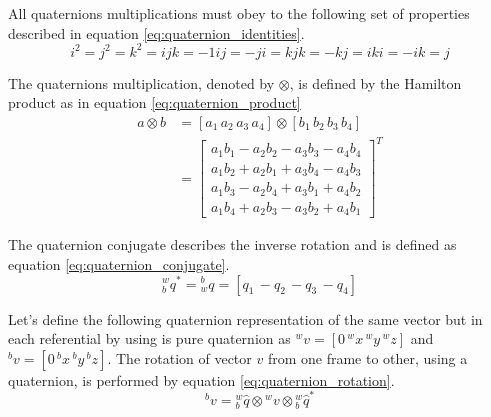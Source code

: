 \begin{description}[]
	\label{list:quaternion_operations}
	\item [Identities] All quaternions multiplications must obey to the following set of properties described in equation \ref{eq:quaternion_identities}.
	\begin{subequations}
		\label{eq:quaternion_identities}
		\begin{equation}
		i^2=j^2 = k^2 = ijk = -1
		\end{equation}
		\begin{equation}
		ij =-ji=k
		\end{equation}
		\begin{equation}
		jk =-kj=i
		\end{equation}
		\begin{equation}
		ki =-ik= j
		\end{equation}
	\end{subequations}
	\item [Quaternion multiplication] The quaternions multiplication, denoted by $\otimes$, is defined by the Hamilton product as in equation \ref{eq:quaternion_product}
	\begin{equation}
	\begin{aligned}
	a \otimes b &= [a_1\, a_2\, a_3\, a_4] \otimes [b_1\, b_2\, b_3\, b_4]\\
	&= \begin{bmatrix}
	a_1b_1 -a_2b_2 -a_3b_3 -a_4b_4\\
	a_1b_2 +a_2b_1 +a_3b_4 -a_4b_3\\
	a_1b_3 -a_2b_4 +a_3b_1 +a_4b_2\\
	a_1b_4 +a_2b_3 -a_3b_2 +a_4b_1
	
	\end{bmatrix}^T
	\end{aligned}
	\label{eq:quaternion_product} 
	\end{equation}
	\item [Quaternion conjugate] The quaternion conjugate describes the inverse rotation and is defined as equation \ref{eq:quaternion_conjugate}.
	\begin{equation}
	{}^w_bq^* = {}^b_wq = [q_1\, -q_2\, -q_3\, -q_4]
	\label{eq:quaternion_conjugate} 
	\end{equation}
	\item [Vector rotation] Let's define the following quaternion representation of the same vector but in each referential by using is \gls{pure quaternion} as ${}^wv = [0\,{}^wx\,{}^wy\,{}^wz]$ and ${}^bv = [0\,{}^bx\,{}^by\,{}^bz]$. The rotation of vector $v$ from one frame to other, using a quaternion, is performed by equation \ref{eq:quaternion_rotation}.
	\begin{equation}
	{}^bv = {}^w_b\hat{q} \otimes {}^wv \otimes {}^w_b\hat{q}^*
	\label{eq:quaternion_rotation}
	\end{equation}
	

\end{description}

